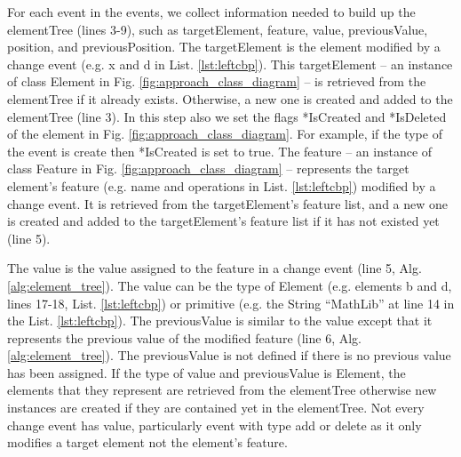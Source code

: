 \documentclass{jot}
\begin{document}
For each \textsf{event} in the \textsf{events}, we collect information needed to build up the \textsf{elementTree}  (lines 3-9), such as \textsf{targetElement}, \textsf{feature}, \textsf{value}, \textsf{previousValue}, \textsf{position}, and \textsf{previousPosition}. The \textsf{targetElement} is the element modified by a change event (e.g. \textsf{x} and \textsf{d} in List. \ref{lst:leftcbp}). This \textsf{targetElement} -- an instance of class Element in Fig. \ref{fig:approach_class_diagram} -- is retrieved from the \textsf{elementTree} if it already exists. Otherwise, a new one is created and added to the \textsf{elementTree} (line 3). In this step also we set the flags \textsf{*IsCreated} and \textsf{*IsDeleted} of the element in Fig. \ref{fig:approach_class_diagram}. For example, if the type of the event is \textsf{create} then \textsf{*IsCreated} is set to \textsf{true}. The \textsf{feature} -- an instance of class Feature in Fig. \ref{fig:approach_class_diagram} -- represents the target element's feature (e.g. \textsf{name} and \textsf{operations} in List. \ref{lst:leftcbp}) modified by a change event. It is  retrieved from the \textsf{targetElement}'s feature list, and a new one is created and added to the \textsf{targetElement}'s feature list if it has not existed yet (line 5). 

The \textsf{value} is the value assigned to the feature in a change event (line 5, Alg. \ref{alg:element_tree}). The \textsf{value} can be the type of \textsf{Element} (e.g. elements \textsf{b} and  \textsf{d}, lines 17-18, List. \ref{lst:leftcbp}) or primitive (e.g. the String ``MathLib'' at line 14 in the List. \ref{lst:leftcbp}). The \textsf{previousValue} is similar to the \textsf{value} except that it represents the previous value of the modified feature (line 6, Alg. \ref{alg:element_tree}). The \textsf{previousValue} is not defined if there is no previous value has been assigned. If the type of \textsf{value} and \textsf{previousValue} is \textsf{Element}, the elements that they represent are retrieved from the \textsf{elementTree} otherwise new instances are created if they are contained yet in the \textsf{elementTree}. Not every change event has \textsf{value}, particularly event with type \textsf{add} or \textsf{delete} as it only modifies a target element not the element's feature.
\end{document}
